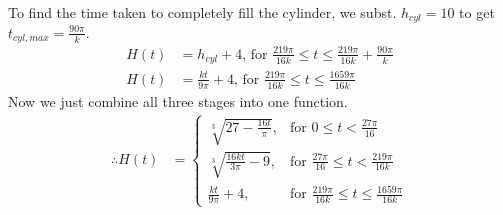 \documentclass[12pt, a4 paper]{article}
\begin{document}
\begin{outline}[enumerate]
\begin{answer}
\begin{align*}
  \end{align*}
  To find the time taken to completely fill the cylinder, we subst. $h_{cyl}=10$ to get $t_{cyl,max}=\frac{90\pi}{k}$.
  \begin{align*}
   H(t) & = h_{cyl} + 4 \textrm{, for }\frac{219\pi}{16k} \leq t \leq \frac{219\pi}{16k} + \frac{90\pi}{k} \\
   H(t) & = \frac{kt}{9\pi}+4 \textrm{, for }\frac{219\pi}{16k} \leq t \leq \frac{1659\pi}{16k}
  \end{align*}
  Now we just combine all three stages into one function.
  \begin{align*}
   \therefore H(t) & =
   \begin{cases}
    \sqrt[3]{27-\frac{16t}{\pi}},  & \textrm{for }  0 \leq t < \frac{27\pi}{16}                       \\
    \sqrt[3]{\frac{16kt}{3\pi}-9}, & \textrm{for } \frac{27\pi}{16} \leq t < \frac{219\pi}{16k}       \\
    \frac{kt}{9\pi}+4,             & \textrm{for } \frac{219\pi}{16k} \leq t \leq \frac{1659\pi}{16k}
   \end{cases}
  \end{align*}
 \end{answer}


\end{outline}
\end{document}

